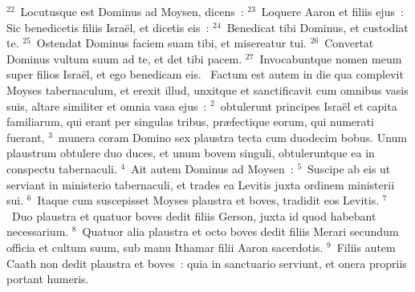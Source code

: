 ${}^{22}$~Locutusque est Dominus ad Moysen, dicens~:
${}^{23}$~Loquere Aaron et filiis ejus~: Sic benedicetis filiis Isra\"el, et dicetis eis~:
${}^{24}$~Benedicat tibi Dominus, et custodiat te.
${}^{25}$~Ostendat Dominus faciem suam tibi, et misereatur tui.
${}^{26}$~Convertat Dominus vultum suum ad te, et det tibi pacem.
${}^{27}$~Invocabuntque nomen meum super filios Isra\"el, et ego benedicam eis.
~Factum est autem in die qua complevit Moyses tabernaculum, et erexit illud, unxitque et sanctificavit cum omnibus vasis suis, altare similiter et omnia vasa ejus~:
${}^{2}$~obtulerunt principes Isra\"el et capita familiarum, qui erant per singulas tribus, pr\ae fectique eorum, qui numerati fuerant,
${}^{3}$~munera coram Domino sex plaustra tecta cum duodecim bobus. Unum plaustrum obtulere duo duces, et unum bovem singuli, obtuleruntque ea in conspectu tabernaculi.
${}^{4}$~Ait autem Dominus ad Moysen~:
${}^{5}$~Suscipe ab eis ut serviant in ministerio tabernaculi, et trades ea Levitis juxta ordinem ministerii sui.
${}^{6}$~Itaque cum suscepisset Moyses plaustra et boves, tradidit eos Levitis.
${}^{7}$~Duo plaustra et quatuor boves dedit filiis Gerson, juxta id quod habebant necessarium.
${}^{8}$~Quatuor alia plaustra et octo boves dedit filiis Merari secundum officia et cultum suum, sub manu Ithamar filii Aaron sacerdotis.
${}^{9}$~Filiis autem Caath non dedit plaustra et boves~: quia in sanctuario serviunt, et onera propriis portant humeris.


